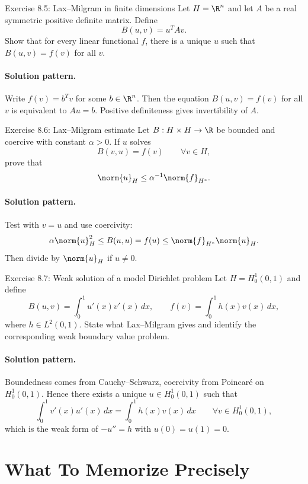 \documentclass[header={Lecture 8 Exam Study Notes}]{study-note}
\begin{document}
\begin{exbox}{Exercise 8.5: Lax--Milgram in finite dimensions}
Let $H=\R^n$ and let $A$ be a real symmetric positive definite matrix. Define
\[
B(u,v)=u^TAv.
\]
Show that for every linear functional $f$, there is a unique $u$ such that $B(u,v)=f(v)$ for all $v$.

\paragraph{Solution pattern.}
Write $f(v)=b^Tv$ for some $b\in\R^n$. Then the equation $B(u,v)=f(v)$ for all $v$ is equivalent to $Au=b$. Positive definiteness gives invertibility of $A$.
\end{exbox}

\begin{exbox}{Exercise 8.6: Lax--Milgram estimate}
Let $B:H\times H\to\R$ be bounded and coercive with constant $\alpha>0$. If $u$ solves
\[
B(v,u)=f(v) \qquad \forall v\in H,
\]
prove that
\[
\norm{u}_H\le \alpha^{-1}\norm{f}_{H^*}.
\]

\paragraph{Solution pattern.}
Test with $v=u$ and use coercivity:
\[
\alpha\norm{u}_H^2\le B(u,u)=f(u)\le \norm{f}_{H^*}\norm{u}_H.
\]
Then divide by $\norm{u}_H$ if $u\neq 0$.
\end{exbox}

\begin{exbox}{Exercise 8.7: Weak solution of a model Dirichlet problem}
Let $H=H_0^1(0,1)$ and define
\[
B(u,v)=\int_0^1 u'(x)v'(x)\,dx,
\qquad
f(v)=\int_0^1 h(x)v(x)\,dx,
\]
where $h\in L^2(0,1)$. State what Lax--Milgram gives and identify the corresponding weak boundary value problem.

\paragraph{Solution pattern.}
Boundedness comes from Cauchy--Schwarz, coercivity from Poincar\'e on $H_0^1(0,1)$. Hence there exists a unique $u\in H_0^1(0,1)$ such that
\[
\int_0^1 v'(x)u'(x)\,dx=\int_0^1 h(x)v(x)\,dx
\qquad \forall v\in H_0^1(0,1),
\]
which is the weak form of $-u''=h$ with $u(0)=u(1)=0$.
\end{exbox}

\section{What To Memorize Precisely}
\end{document}
